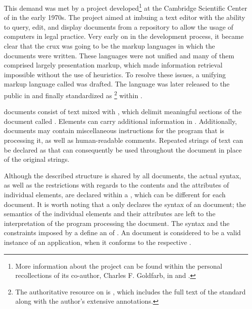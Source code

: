 \documentclass{book}
\begin{document}
This demand was met by a project developed\footnote{
  More information about the project can be found within the personal
  recollections of its co-author, Charles F. Goldfarb, in \cite{goldfarb96} and
  \cite{goldfarb97:whySGML}.
} at the Cambridge Scientific Center of  in the early 1970s. The
project aimed at imbuing a text editor with the ability to query, edit, and
display documents from a repository to allow the usage of computers in legal
practice. Very early on in the development process, it became clear that the
crux was going to be the markup languages in which the documents were written.
These languages were not unified and many of them comprised largely presentation
markup, which made information retrieval impossible without the use of
heuristics. To resolve these issues, a unifying markup language called
 was drafted. The language was later released to the public in
\cite{goldfarb81} and finally standardized as \footnote{
  The authoritative resource on  is \cite{goldfarb91}, which
  includes the full text of the standard along with the author's extensive
  annotations.
} within \cite{iso8879}.

 documents consist of text mixed with %
, which delimit meaningful sections of the document called
. Elements can carry additional
information in . Additionally,
 documents may contain miscellaneous instructions for the program
that is processing it, as well as human-readable comments. Repeated strings of
text can be declared as   that can
consequently be used throughout the document in place of the original strings.

Although the described structure is shared by all  documents, the
actual syntax, as well as the restrictions with regards to the contents and the
attributes of individual elements, are declared within a , which
can be different for each document. It is worth noting that a  only
declares the syntax of an  document; the semantics of the
individual elements and their attributes are left to the interpretation of the
program processing the document. The syntax and the constraints imposed by a
 define an   of
. An  document is considered to be a valid instance
of an  application, when it conforms to the respective
.
\end{document}
